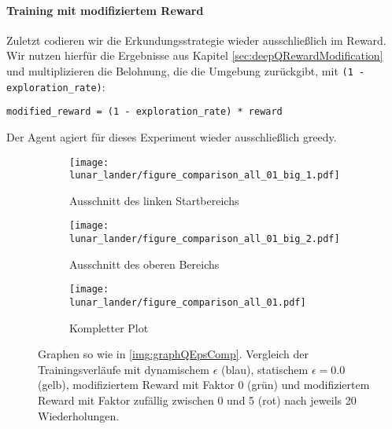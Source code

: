 \paragraph{Training mit modifiziertem Reward}
Zuletzt codieren wir die Erkundungsstrategie wieder ausschließlich im Reward. Wir nutzen hierfür die Ergebnisse aus Kapitel \ref{sec:deepQRewardModification} und multiplizieren die Belohnung, die die Umgebung zurückgibt, mit \texttt{(1 - exploration_rate)}:
\begin{verbatim}
modified_reward = (1 - exploration_rate) * reward
\end{verbatim}
Der Agent agiert für dieses Experiment wieder ausschließlich greedy.
\begin{figure}[h!]
    \centering
    \begin{subfigure}[b]{0.49\textwidth}
        \texttt{[image: lunar\_lander/figure\_comparison\_all\_01\_big\_1.pdf]}
        \caption{Ausschnitt des linken Startbereichs}
        \label{img:lunarComparisonAll01Big1}
    \end{subfigure}
    \begin{subfigure}[b]{0.49\textwidth}
        \texttt{[image: lunar\_lander/figure\_comparison\_all\_01\_big\_2.pdf]}
        \caption{Ausschnitt des oberen Bereichs}
        \label{img:lunarComparisonAll01Big2}
    \end{subfigure}
    \begin{subfigure}[b]{0.7\textwidth}
        \texttt{[image: lunar\_lander/figure\_comparison\_all\_01.pdf]}
        \caption{Kompletter Plot}
        \label{img:lunarComparisonAll01}
    \end{subfigure}
    \caption{Graphen so wie in \ref{img:graphQEpsComp}. Vergleich der Trainingsverläufe mit dynamischem $ \epsilon $ (blau), statischem $ \epsilon = 0.0 $ (gelb), modifiziertem Reward mit Faktor 0 (grün) und modifiziertem Reward mit Faktor zufällig zwischen 0 und 5 (rot) nach jeweils 20 Wiederholungen.}
    \label{img:lunarComparisonAll01All}
\end{figure}



